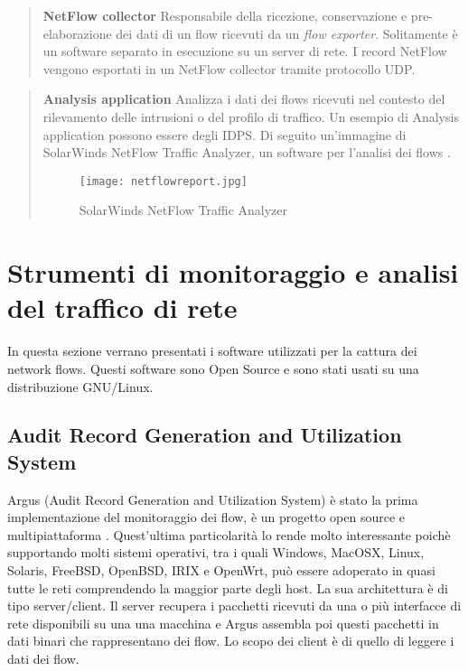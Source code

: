 \documentclass[../main.tex]{subfiles}
\begin{document}
\begin{verse}
\textbf{NetFlow collector}
Responsabile della ricezione, conservazione e pre-elaborazione dei dati di un flow ricevuti da un \textit{flow exporter}. Solitamente è un software separato in esecuzione su un server di rete. I record NetFlow vengono esportati in un NetFlow collector tramite protocollo UDP.
\end{verse}

\begin{verse}
\textbf{Analysis application} 
Analizza i dati dei flows ricevuti nel contesto del rilevamento delle intrusioni o del profilo di traffico. Un esempio di Analysis application possono essere degli IDPS.
Di seguito un'immagine di SolarWinds NetFlow Traffic Analyzer, un software per l'analisi dei flows \cite{solarwinds}.

\begin{figure}[H]
\centering
\texttt{[image: netflowreport.jpg]}
\caption{SolarWinds NetFlow Traffic Analyzer}
\end{figure}
\end{verse}

\section{Strumenti di monitoraggio e analisi del traffico di rete}
In questa sezione verrano presentati i software utilizzati per la cattura dei network flows. Questi software sono Open Source e sono stati usati su una distribuzione GNU/Linux.

\subsection{Audit Record Generation and Utilization System}
Argus (Audit Record Generation and Utilization System) è stato la prima implementazione del monitoraggio dei flow, è un progetto open source e multipiattaforma \cite{Argus}.
Quest'ultima particolarità lo rende molto interessante poichè supportando molti sistemi operativi, tra i quali Windows, MacOSX, Linux, Solaris, FreeBSD, OpenBSD, IRIX e OpenWrt, può essere adoperato in quasi tutte le reti comprendendo la maggior parte degli host. La sua architettura è di tipo server/client. Il server recupera i pacchetti ricevuti da una o più interfacce di rete disponibili su una una macchina e Argus assembla poi questi pacchetti in dati binari che rappresentano dei flow. Lo scopo dei client è di quello di leggere i dati dei flow. 
\end{document}

